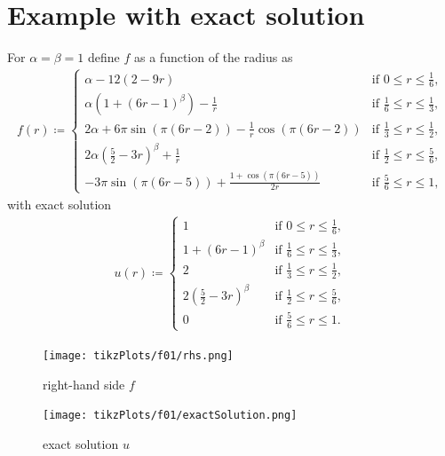 \documentclass[draft=false,twoside,12pt]{scrreprt}
\begin{document}
\section{Example with exact solution}
For $\alpha = \beta = 1$ define $f$ as a function of the radius as
\begin{align}
  \label{equ:f01}
  f(r)\coloneqq 
  \begin{cases}
    \alpha-12(2-9r) & \text{if } 0\leq r\leq\frac{1}{6},\\
    \alpha(1+(6r-1)^\beta)-\frac{1}{r} & \text{if } \frac{1}{6}\leq r\leq
    \frac{1}{3},\\
    2\alpha+6\pi\sin(\pi(6r-2))-\frac{1}{r}\cos(\pi(6r-2)) &
    \text{if } \frac{1}{3}\leq r\leq\frac{1}{2},\\
    2\alpha(\frac{5}{2}-3r)^\beta+\frac{1}{r}&
    \text{if } \frac{1}{2}\leq r\leq\frac{5}{6},\\
    -3\pi\sin(\pi(6r-5))+\frac{1+\cos(\pi(6r-5))}{2r} &
    \text{if } \frac{5}{6}\leq r\leq 1,
  \end{cases}
\end{align}
with exact solution
\begin{align}
  \label{equ:f01exactSol}
  u(r)\coloneqq
  \begin{cases}
    1 & \text{if } 0\leq r\leq\frac{1}{6},\\
    1+(6r-1)^\beta & \text{if } \frac{1}{6}\leq r\leq
    \frac{1}{3},\\
    2 &
    \text{if } \frac{1}{3}\leq r\leq\frac{1}{2},\\
    2(\frac{5}{2}-3r)^\beta &
    \text{if } \frac{1}{2}\leq r\leq\frac{5}{6},\\
    0 &
    \text{if } \frac{5}{6}\leq r\leq 1.
  \end{cases}
\end{align}

\begin{minipage}[t]{0.45\textwidth}
  \begin{figure}[H]
	  \centering
		\texttt{[image: tikzPlots/f01/rhs.png]} 
		\caption{right-hand side $f$}
  \end{figure}
\end{minipage}
\begin{minipage}[t]{0.45\textwidth}
  \begin{figure}[H]
	  \centering
		\texttt{[image: tikzPlots/f01/exactSolution.png]} 
		\caption{exact solution $u$}
  \end{figure}
\end{minipage}
\end{document}

